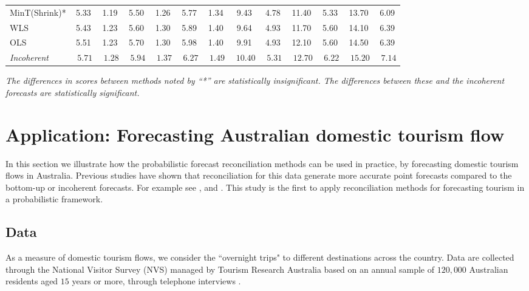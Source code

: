 \documentclass[12pt]{article}
\def\mathbi#1{\textit{ #1}}
\theoremstyle{definition}
\begin{document}
\begin{table}
\begin{center}
{\begin{tabular}{@{}lSSSSSS|SSSSSS@{}}
				MinT(Shrink)*	  & 5.33 & 1.19 & 5.50 & 1.26 & 5.77 & 1.34 & 9.43 & 4.78 & 11.40 & 5.33 & 13.70 & 6.09 \\
				WLS          	  & 5.43 & 1.23 & 5.60 & 1.30 & 5.89 & 1.40 & 9.64 & 4.93 & 11.70 & 5.60 & 14.10 & 6.39 \\
				OLS          	  & 5.51 & 1.23 & 5.70 & 1.30 & 5.98 & 1.40 & 9.91 & 4.93 & 12.10 & 5.60 &
				14.50 & 6.39\\
				\textit{Incoherent} & $\mathbi{5.71}$ & $\mathbi{1.28}$ & $\mathbi{5.94}$ & $\mathbi{1.37}$ & $\mathbi{6.27}$ & $\mathbi{1.49}$ &$\mathbi{10.40}$& $\mathbi{5.31}$ & $\mathbi{12.70}$ & $\mathbi{6.22}$ & $\mathbi{15.20}$ & $\mathbi{7.14}$\\
				\bottomrule
			\end{tabular}
		}
	\end{center}
	\textit{The differences in scores between methods noted by ``*'' are statistically insignificant. The differences between these and the incoherent forecasts are statistically significant.}
\end{table}

\section{Application: Forecasting Australian domestic tourism flow}\label{sec:Application}

In this section we illustrate how the probabilistic forecast reconciliation methods can be used in practice, by forecasting domestic tourism flows in Australia. Previous studies have shown that reconciliation for this data generate more accurate point forecasts compared to the bottom-up or incoherent forecasts. For example see \citet{AthEtAl2009}, \citet{HynEtAl2011} and \citet{WicEtAl2019}. This study is the first to apply reconciliation methods for forecasting tourism in a probabilistic framework.

\subsection{Data}
As a measure of domestic tourism flows, we consider the ``overnight trips" to different destinations across the country.
Data are collected through the National Visitor Survey (NVS) managed by Tourism Research Australia based on an annual sample of $120,000$ Australian residents aged $15$ years or more, through telephone interviews \citep{TourismResearch2019}.
\end{document}
